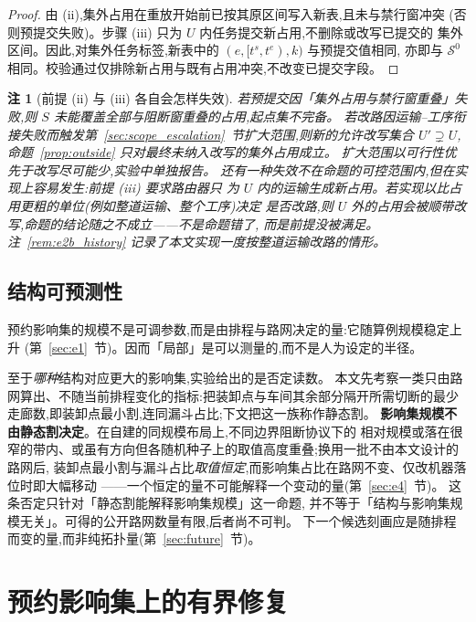 \documentclass[manuscript,screen,review]{acmart}
\newtheorem{remark}{注}
\begin{document}
\begin{proof}
由 (ii),集外占用在重放开始前已按其原区间写入新表,且未与禁行窗冲突
(否则预提交失败)。步骤 (iii) 只为 \(U\) 内任务提交新占用,不删除或改写已提交的
集外区间。因此,对集外任务标签,新表中的 \((e,[t^s,t^e),k)\) 与预提交值相同,
亦即与 \(\mathcal{S}^0\) 相同。校验通过仅排除新占用与既有占用冲突,不改变已提交字段。
\end{proof}

\begin{remark}[前提 (ii) 与 (iii) 各自会怎样失效]
\label{rem:precommit}
若预提交因「集外占用与禁行窗重叠」失败,则 \(S\) 未能覆盖全部与阻断窗重叠的占用,起点集不完备。
若改路因运输--工序衔接失败而触发第~\ref{sec:scope_escalation}~节扩大范围,则新的允许改写集合
\(U'\supsetneq U\),命题~\ref{prop:outside} 只对最终未纳入改写的集外占用成立。
扩大范围以可行性优先于改写尽可能少,实验中单独报告。
还有一种失效不在命题的可控范围内,但在实现上容易发生:前提 (iii) 要求路由器\emph{只}
为 \(U\) 内的运输生成新占用。若实现以比占用更粗的单位(例如整道运输、整个工序)决定
是否改路,则 \(U\) 外的占用会被顺带改写,命题的结论随之不成立——不是命题错了,
而是前提没被满足。注~\ref{rem:e2b_history} 记录了本文实现一度按整道运输改路的情形。
\end{remark}

\subsection{结构可预测性}
\label{sec:structure}

预约影响集的规模不是可调参数,而是由排程与路网决定的量:它随算例规模稳定上升
(第~\ref{sec:e1}~节)。因而「局部」是可以测量的,而不是人为设定的半径。

至于\emph{哪种}结构对应更大的影响集,实验给出的是否定读数。
本文先考察一类只由路网算出、不随当前排程变化的指标:把装卸点与车间其余部分隔开所需切断的最少走廊数,即装卸点最小割,连同漏斗占比;下文把这一族称作静态割。
\textbf{影响集规模不由静态割决定}。在自建的同规模布局上,不同边界阻断协议下的
相对规模或落在很窄的带内、或虽有方向但各随机种子上的取值高度重叠;换用一批不由本文设计的路网后,
装卸点最小割与漏斗占比\emph{取值恒定},而影响集占比在路网不变、仅改机器落位时即大幅移动
——一个恒定的量不可能解释一个变动的量(第~\ref{sec:e4}~节)。
这条否定只针对「静态割能解释影响集规模」这一命题,
并不等于「结构与影响集规模无关」。可得的公开路网数量有限,后者尚不可判。
下一个候选刻画应是随排程而变的量,而非纯拓扑量(第~\ref{sec:future}~节)。

\section{预约影响集上的有界修复}
\label{sec:repair}
\end{document}
